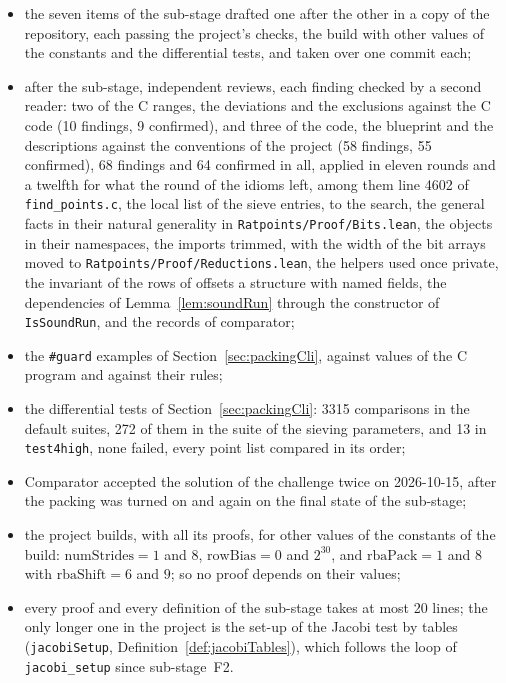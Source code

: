 \begin{itemize}
    $32$-bit halves and to the loops over the moduli that step two cursors; a prototype of all the
    proofs on the sketch; and a review of the plan of this chapter by four readers (59 findings, 44
    confirmed and 14 in part, one refuted), each finding checked by a second reader;
  \item the seven items of the sub-stage drafted one after the other in a copy of the repository,
    each passing the project's checks, the build with other values of the constants and the
    differential tests, and taken over one commit each;
  \item after the sub-stage, independent reviews, each finding checked by a second reader: two of
    the C ranges, the deviations and the exclusions against the C code (10 findings, 9 confirmed),
    and three of the code, the blueprint and the descriptions against the conventions of the project
    (58 findings, 55 confirmed), 68 findings and 64 confirmed in all, applied in eleven rounds and a
    twelfth for what the round of the idioms left, among them line 4602 of \verb|find_points.c|,
    the local list of the sieve entries, to the search, the general facts in their natural
    generality in \verb|Ratpoints/Proof/Bits.lean|, the objects in their namespaces, the imports
    trimmed, with the width of the bit arrays moved to \verb|Ratpoints/Proof/Reductions.lean|, the
    helpers used once private, the invariant of the rows of offsets a structure with named fields,
    the dependencies of Lemma~\ref{lem:soundRun} through the constructor of \verb|IsSoundRun|, and
    the records of comparator;
  \item the \verb|#guard| examples of Section~\ref{sec:packingCli}, against values of the C program
    and against their rules;
  \item the differential tests of Section~\ref{sec:packingCli}: 3315 comparisons in the default
    suites, 272 of them in the suite of the sieving parameters, and 13 in \verb|test4high|, none
    failed, every point list compared in its order;
  \item Comparator accepted the solution of the challenge twice on 2026-10-15, after the packing was
    turned on and again on the final state of the sub-stage;
  \item the project builds, with all its proofs, for other values of the constants of the build:
    $\mathrm{numStrides} = 1$ and $8$, $\mathrm{rowBias} = 0$ and $2^{30}$, and
    $\mathrm{rbaPack} = 1$ and $8$ with $\mathrm{rbaShift} = 6$ and $9$; so no proof depends on
    their values;
  \item every proof and every definition of the sub-stage takes at most 20 lines; the only longer
    one in the project is the set-up of the Jacobi test by tables (\verb|jacobiSetup|,
    Definition~\ref{def:jacobiTables}), which follows the loop of \verb|jacobi_setup| since
    sub-stage~F2.
\end{itemize}
